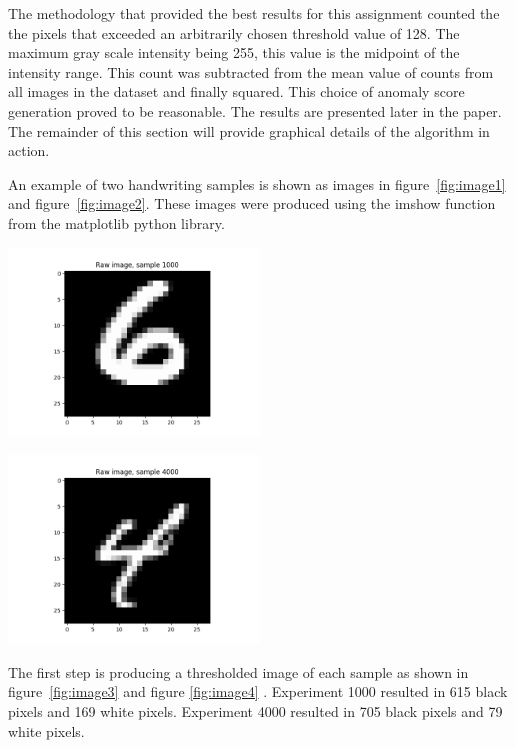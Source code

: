 The methodology that provided the best results for this assignment counted the the pixels that exceeded an arbitrarily chosen threshold value of 128. The maximum gray scale intensity being 255, this value is the midpoint of the intensity range. This count was subtracted from the mean value of counts from all images in the dataset and finally squared. This choice of anomaly score generation proved to be reasonable. The results are presented later in the paper. The remainder of this section will provide graphical details of the algorithm in action.

An example of two handwriting samples is shown as images in figure~\ref{fig:image1} and figure~\ref{fig:image2}. These images were produced using the imshow function from the matplotlib python library.\newline

\begin{center}
\includegraphics[width=0.5\textwidth]{image1.png}
\end{center}

\begin{center}
\includegraphics[width=0.5\textwidth]{image2.png}
\end{center}

The first step is producing a thresholded image of each sample as shown in figure~\ref{fig:image3} and figure \ref{fig:image4} . Experiment 1000 resulted in 615 black pixels and 169 white pixels. Experiment 4000 resulted in 705 black pixels and 79 white pixels.

